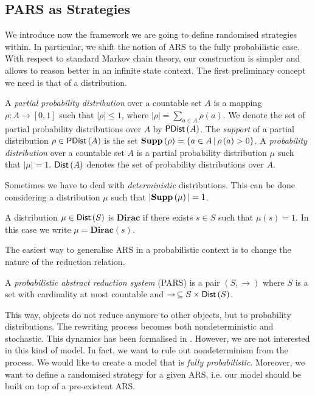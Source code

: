 \subsection{PARS as Strategies}
We introduce now the framework we are going to define randomised
strategies within. In particular, we shift the notion of ARS to the fully
probabilistic case. With respect to standard Markov chain theory, our
construction is simpler and allows to reason better in an infinite
state context. The first preliminary concept we need is that of a distribution.
\begin{definition}[Distribution]
	A \emph{partial probability distribution} over a countable set $A$
	is a mapping $\rho:A\rightarrow\left[0,1\right]$ such that
	$\left|\rho\right|\leq 1$, where
	$\left|\rho\right|=\underset{a\in A}{\sum}\rho\left(a\right)$. We denote the set of partial probability distributions over $A$
	by $\textsf{PDist}\left(A\right)$. The \emph{support} of a partial distribution
	$\rho\in\textsf{PDist}\left(A\right)$ is the set $\textbf{Supp}\left(\rho\right)=\left\lbrace a \in A \, |
	\, \rho\left( a\right) >0\right\rbrace $.  A \emph{probability
		distribution} over a countable set $A$ is a partial probability
	distribution $\mu$ such that $\left|\mu\right|=1$. $\textsf{Dist}\left(A\right)$ denotes the set
	of probability distributions over $A$.
\end{definition}
Sometimes we have to deal with \emph{deterministic} distributions. This can be done considering a distribution $\mu$ such that $|\textbf{Supp}\left(\mu\right)|=1$.
\begin{definition}
	A distribution $\mu\in\textsf{Dist}\left(S\right)$ is $\textbf{Dirac}$ if there exists $s\in S$ such that $\mu(s)=1$. In this case we write $\mu=\textbf{Dirac}(s)$.
\end{definition}
The easiest way to generalise ARS in a probabilistic context is to change the nature of the reduction relation.
\begin{definition}[PARS]
	A \emph{probabilistic abstract reduction system} (PARS) is a pair $(S,\rightarrow)$ where $S$ is a set with cardinality at most countable and $\rightarrow\,\subseteq S\times \textsf{Dist}\left(S\right)$.
\end{definition}
This way, objects do not reduce anymore to other objects, but to probability distributions. The rewriting process becomes both nondeterministic and stochastic. This dynamics has been formalised in \cite{avanzini_probabilistic_2018}. However, we are not interested in this kind of model. In fact, we want to rule out nondeterminism from the process. We would like to create a model that is \emph{fully probabilistic}. Moreover, we want to define a randomised strategy for a given ARS, i.e. our model should be built on top of a pre-existent ARS.
